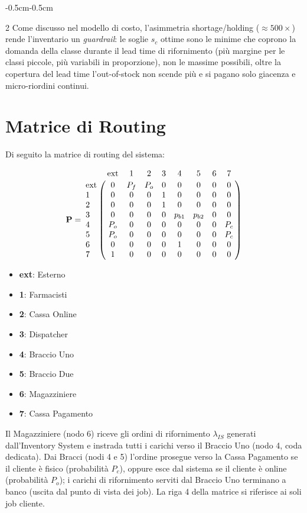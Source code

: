 \documentclass{article}
\begin{document}
\begin{adjustwidth}{-0.5cm}{-0.5cm}
\begin{multicols}{2}
Come discusso nel modello di costo, l'asimmetria shortage/holding ($\approx 500\times$) rende
l'inventario un \emph{guardrail}: le soglie $s_c$ ottime sono le minime che coprono la domanda
della classe durante il lead time di rifornimento (più margine per le classi piccole, più
variabili in proporzione), non le massime possibili,  oltre la copertura del lead time
l'out-of-stock non scende più e si pagano solo giacenza e micro-riordini continui.
\end{multicols}

\section*{Matrice di Routing}

\noindent
\begin{minipage}[t]{0.48\textwidth}
\raggedright
Di seguito la matrice di routing del sistema:

\[
\mathbf{P}=
\bordermatrix{
           & \text{ext} & 1 & 2 & 3 & 4 & 5 & 6 & 7 \cr
\text{ext} & 0   & P_f & P_o & 0 & 0      & 0      & 0 & 0   \cr
1          & 0   & 0   & 0   & 1 & 0      & 0      & 0 & 0   \cr
2          & 0   & 0   & 0   & 1 & 0      & 0      & 0 & 0   \cr
3          & 0   & 0   & 0   & 0 & p_{b1} & p_{b2} & 0 & 0   \cr
4          & P_o & 0   & 0   & 0 & 0      & 0      & 0 & P_c \cr
5          & P_o & 0   & 0   & 0 & 0      & 0      & 0 & P_c \cr
6          & 0   & 0   & 0   & 0 & 1      & 0      & 0 & 0   \cr
7          & 1   & 0   & 0   & 0 & 0      & 0      & 0 & 0   \cr
}
\]

\begin{itemize}
    \item \textbf{ext}: Esterno
    \item \textbf{1}: Farmacisti
    \item \textbf{2}: Cassa Online
    \item \textbf{3}: Dispatcher
    \item \textbf{4}: Braccio Uno
    \item \textbf{5}: Braccio Due
    \item \textbf{6}: Magazziniere
    \item \textbf{7}: Cassa Pagamento
\end{itemize}

Il Magazziniere (nodo 6) riceve gli ordini di rifornimento $\lambda_{IS}$ generati
dall'Inventory System e instrada tutti i carichi verso il Braccio Uno (nodo 4, coda dedicata).
Dai Bracci (nodi 4 e 5) l'ordine prosegue verso la Cassa Pagamento se il cliente è fisico
(probabilità $P_c$), oppure esce dal sistema se il cliente è online (probabilità $P_o$); i
carichi di rifornimento serviti dal Braccio Uno terminano a banco (uscita dal punto di vista dei
job). La riga 4 della matrice si riferisce ai soli job cliente.


\end{minipage}
\end{adjustwidth}
\end{document}
